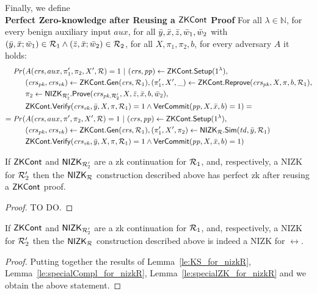 \noindent Finally, we define \\ 
\noindent \textbf{Perfect Zero-knowledge after Reusing a ${\mathsf{ZKCont}}$ Proof} For all $\lambda \in \mathbb{N}$, for every benign auxiliary input $aux$, 
for all $\bar{y},\bar{x},\bar{z}, \bar{w}_1, \bar{w}_2$ with $(\bar{y}, \bar{x}; \bar{w}_1) \in \mathcal{R}_1 \wedge (\bar{z}, \bar{x}; \bar{w}_2) \in \mathcal{R}_2$, for all $X,\pi_1,\pi_2, b$, for every adversary $A$ it holds:
\begin{align*}
\mathit{Pr}(& A(\mathit{crs}, aux, \pi'_1,\pi_2, X', \mathcal{R}) = 1 \ | \ (\mathit{crs}, \mathit{pp}) \leftarrow {\ensuremath{\mathsf{ZKCont}}}.{\mathsf{Setup}} (1^{\lambda}), \\
                  & (\mathit{crs}_{\mathit{pk}}, \mathit{crs}_{\mathit{vk}}) \leftarrow {\ensuremath{\mathsf{ZKCont}}}.\mathsf{Gen}(\mathit{crs}, \mathcal{R}_1), (\pi'_1, X', \_) \leftarrow {\ensuremath{\mathsf{ZKCont}}}.{\mathsf{Reprove}} (\mathit{crs}_{\mathit{pk}}, X, \pi, b, \mathcal{R}_1), \\
                  & \pi_2 \leftarrow {\ensuremath{\mathsf{NIZK_{\mathcal{R}'_2}}}}.{\mathsf{Prove}}(\mathit{crs}_{\mathit{pk},{\mathcal{R}'_2}}, X, \bar{z}, \bar{x}, b, \bar{w}_2), \\
                  &  {\mathsf{ZKCont}}.{\mathsf{Verify}}(\mathit{crs}_{\mathit{vk}}, \bar{y}, X, \pi, \mathcal{R}_1) = 1 
                  \wedge {\ensuremath{\mathsf{VerCommit}}}(\mathit{pp}, X, \bar{x}, b) = 1) =  \\
= \mathit{Pr}(& A(\mathit{crs}, aux, \pi',\pi_2, X', \mathcal{R}) = 1 \ | \ (\mathit{crs}, \mathit{pp}) \leftarrow {\ensuremath{\mathsf{ZKCont}}}.{\mathsf{Setup}} (1^{\lambda}), \\ 
                     & (\mathit{crs}_{\mathit{pk}}, \mathit{crs}_{\mathit{vk}}) \leftarrow {\ensuremath{\mathsf{ZKCont}}}.\mathsf{Gen}(\mathit{crs}, \mathcal{R}_1), (\pi'_1, X',\pi_2) \leftarrow {\ensuremath{\mathsf{NIZK_{\mathcal{R}}}}}.{\mathsf{Sim}}(\mathit{td}, \bar{y}, \mathcal{R}_1) \\ 
                     &  {\mathsf{ZKCont}}.{\mathsf{Verify}}(\mathit{crs}_{\mathit{vk}}, \bar{y}, X, \pi, \mathcal{R}_1) = 1
                    \wedge {\ensuremath{\mathsf{VerCommit}}}(\mathit{pp}, X, \bar{x}, b) = 1)
\end{align*}

\begin{lemma} 
\label{le:specialZK_for_nizkR}
If ${\mathsf{ZKCont}}$ and ${\mathsf{NIZK_{\mathcal{R}'_2}}}$ are a zk continuation for $\mathcal{R}_1$, and, respectively, a NIZK 
for $\mathcal{R}_2'$ then the ${\mathsf{NIZK_{\mathcal{R}}}}$ construction described above has perfect zk after reusing a ${\mathsf{ZKCont}}$ proof.
\end{lemma} 
\begin{proof} {\color{red}TO DO.}
\end{proof}
 
\begin{corollary}If ${\mathsf{ZKCont}}$ and ${\mathsf{NIZK_{\mathcal{R}'_2}}}$ are a zk continuation for $\mathcal{R}_1$, and, respectively, a NIZK 
for $\mathcal{R}_2'$ then the ${\mathsf{NIZK_{\mathcal{R}}}}$ construction described above is indeed a NIZK for $\rel$.
 \end{corollary}
 
\begin{proof} Putting together the results of Lemma~\ref{le:KS_for_nizkR}, Lemma~\ref{le:specialCompl_for_nizkR}, 
Lemma~\ref{le:specialZK_for_nizkR} and  we obtain the above statement.
\end{proof} 
